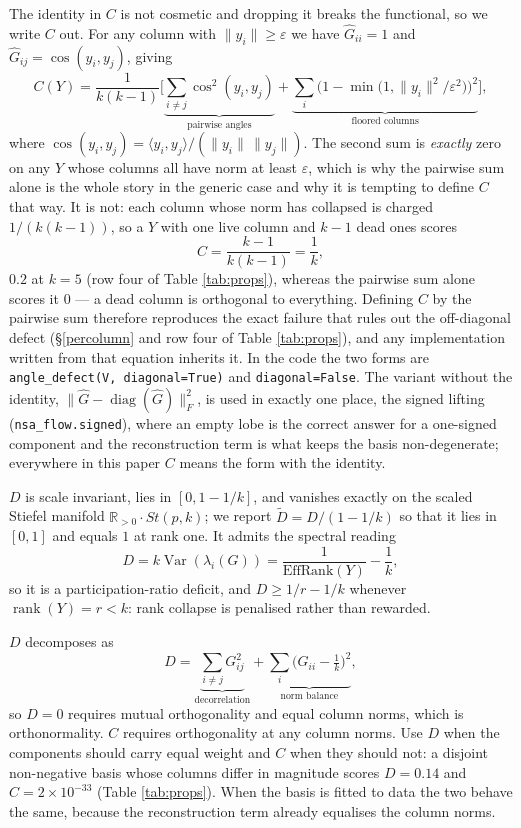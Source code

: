 \documentclass[
]{article}
\begin{document}
The identity in \(C\) is not cosmetic and dropping it breaks the functional, so we
write \(C\) out. For any column with \(\|y_i\| \ge \varepsilon\) we have
\(\widehat{G}_{ii} = 1\) and \(\widehat{G}_{ij} = \cos(y_i, y_j)\), giving
\[
C(Y) = \frac{1}{k(k-1)} \Bigg[ \underbrace{\sum_{i \neq j} \cos^2(y_i, y_j)}_{\text{pairwise angles}}
 + \underbrace{\sum_i \Big( 1 - \min\big(1, \|y_i\|^2/\varepsilon^2\big) \Big)^2}_{\text{floored columns}} \Bigg] ,
\]
where \(\cos(y_i, y_j) = \langle y_i, y_j\rangle / (\|y_i\|\,\|y_j\|)\). The second
sum is \emph{exactly} zero on any \(Y\) whose columns all have norm at least
\(\varepsilon\), which is why the pairwise sum alone is the whole story in the
generic case and why it is tempting to define \(C\) that way. It is not: each
column whose norm has collapsed is charged \(1/(k(k-1))\), so a \(Y\) with one
live column and \(k-1\) dead ones scores
\[
C = \frac{k-1}{k(k-1)} = \frac{1}{k},
\]
\(0.2\) at \(k = 5\) (row four of Table \ref{tab:props}), whereas the pairwise sum
alone scores it \(0\) --- a dead column is orthogonal to everything. Defining \(C\)
by the pairwise sum therefore reproduces the exact failure that rules out the
off-diagonal defect (§\ref{percolumn} and row four of Table \ref{tab:props}),
and any implementation written from that equation inherits it. In the code the
two forms are \texttt{angle\_defect(V,\ diagonal=True)} and \texttt{diagonal=False}. The variant
without the identity, \(\|\widehat{G} - \operatorname{diag}(\widehat{G})\|_F^2\),
is used in exactly one place, the signed lifting (\texttt{nsa\_flow.signed}), where an
empty lobe is the correct answer for a one-signed component and the
reconstruction term is what keeps the basis non-degenerate; everywhere in this
paper \(C\) means the form with the identity.

\(D\) is scale invariant, lies in \([0, 1 - 1/k]\), and vanishes exactly on the scaled Stiefel manifold \(\mathbb{R}_{>0}\cdot St(p,k)\); we report \(\tilde D = D / (1 - 1/k)\) so that it lies in \([0,1]\) and equals \(1\) at rank one. It admits the spectral reading
\[
D = k \operatorname{Var}(\lambda_i(G)) = \frac{1}{\mathrm{EffRank}(Y)} - \frac{1}{k},
\]
so it is a participation-ratio deficit, and \(D \ge 1/r - 1/k\) whenever \(\operatorname{rank}(Y) = r < k\): rank collapse is penalised rather than rewarded.

\(D\) decomposes as
\[
D = \underbrace{\sum_{i \neq j} G_{ij}^2}_{\text{decorrelation}}
  + \underbrace{\sum_i \big(G_{ii} - \tfrac1k\big)^2}_{\text{norm balance}},
\]
so \(D = 0\) requires mutual orthogonality and equal column norms, which is orthonormality. \(C\) requires orthogonality at any column norms. Use \(D\) when the components should carry equal weight and \(C\) when they should not: a disjoint non-negative basis whose columns differ in magnitude scores \(D = 0.14\) and \(C = 2\times 10^{-33}\) (Table \ref{tab:props}). When the basis is fitted to data the two behave the same, because the reconstruction term already equalises the column norms.
\end{document}
